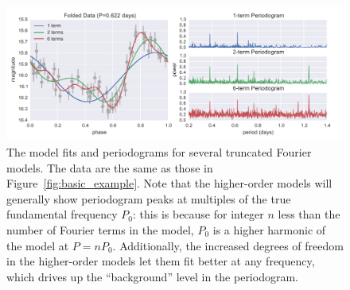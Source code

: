 \documentclass{emulateapj}
\newcommand{\Fig}[1]{Figure~\ref{fig:#1}}
\newcommand{\fig}[1]{\Fig{#1}}
\newcommand{\figlabel}[1]{\label{fig:#1}}
\begin{document}
\begin{figure}
  \centering
  \includegraphics[width=\textwidth]{fig03.pdf}
  \caption{
    The model fits and periodograms for several truncated Fourier models.
    The data are the same as those in \fig{basic_example}. Note that the
    higher-order models will generally show periodogram peaks at multiples
    of the true fundamental frequency $P_0$: this is because for integer $n$
    less than the number of Fourier terms in the model, $P_0$ is a higher
    harmonic of the model at $P=nP_0$. Additionally, the increased degrees of
    freedom in the higher-order models let them fit better at any frequency,
    which drives up the ``background'' level in the periodogram.
  }
  \figlabel{multiterm_example}
\end{figure}
\end{document}
